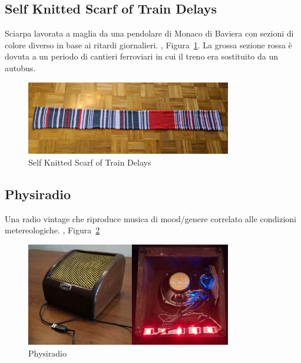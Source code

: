\documentclass[12pt,a4paper]{report}
\begin{document}
\subsection{Self Knitted Scarf of Train Delays}
Sciarpa lavorata a maglia da una pendolare di Monaco di Baviera con sezioni di colore diverso in base ai ritardi giornalieri. \cite{physlist}, Figura~\ref{fig:scarfdelays}.
La grossa sezione rossa è dovuta a un periodo di cantieri ferroviari in cui il treno era sostituito da un autobus.

\begin{figure}[h]
  \centering
  \includegraphics[width=0.8\textwidth]{scarfdelays}
  \caption{Self Knitted Scarf of Train Delays}
  \label{fig:scarfdelays}
\end{figure}

\subsection{Physiradio}
Una radio vintage che riproduce musica di mood/genere correlato alle condizioni metereologiche. \cite{physiradio}, Figura~\ref{fig:physiradio}
\begin{figure}[h]
  \centering
  \includegraphics[width=0.8\textwidth]{physiradio}
  \caption{Physiradio}
  \label{fig:physiradio}
\end{figure}
\end{document}
